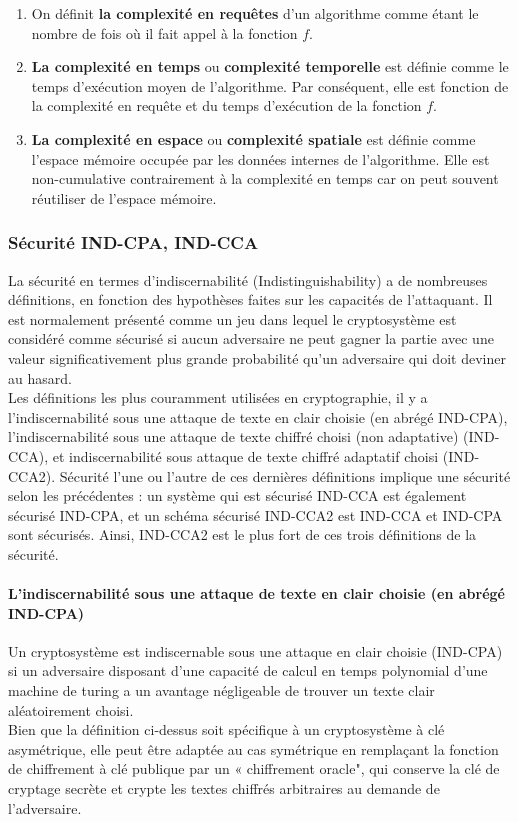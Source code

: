 \documentclass[12pt,openany]{report}
\begin{document}
\begin{enumerate}
\item On définit \textbf{la complexité en requêtes} d’un algorithme comme étant le
nombre de fois où il fait appel à la fonction $f$.

\item  \textbf{La complexité en temps} ou \textbf{complexité temporelle} est définie comme
le temps d’exécution moyen de l’algorithme. Par conséquent, elle est
fonction de la complexité en requête et du temps d’exécution de la fonction
$f$.
\item  \textbf{La complexité en espace} ou \textbf{complexité spatiale} est définie comme
l’espace mémoire occupée par les données internes de l’algorithme. Elle
est non-cumulative contrairement à la complexité en temps car on peut
souvent réutiliser de l’espace mémoire.
\end{enumerate}
\subsubsection{Sécurité IND-CPA, IND-CCA}
La sécurité en termes d'indiscernabilité (Indistinguishability) a de nombreuses définitions, en fonction des hypothèses
faites sur les capacités de l’attaquant. Il est normalement présenté comme un jeu dans lequel 
le cryptosystème est considéré comme sécurisé si aucun adversaire ne peut gagner la partie avec une valeur significativement plus grande
probabilité qu'un adversaire qui doit deviner au hasard.\\ Les définitions les plus couramment utilisées
en cryptographie, il y a l'indiscernabilité sous une attaque de texte en clair choisie (en abrégé IND-CPA), l'indiscernabilité sous une attaque de texte chiffré choisi (non adaptative) (IND-CCA),
et indiscernabilité sous attaque de texte chiffré adaptatif choisi (IND-CCA2). Sécurité
l'une ou l'autre de ces dernières définitions implique une sécurité selon les précédentes : un système qui
est sécurisé IND-CCA est également sécurisé IND-CPA, et un schéma sécurisé IND-CCA2 est
IND-CCA et IND-CPA sont sécurisés. Ainsi, IND-CCA2 est le plus fort de ces trois
définitions de la sécurité.

\paragraph{L'indiscernabilité sous une attaque de texte en clair choisie (en abrégé IND-CPA)\\}
Un cryptosystème est indiscernable sous une attaque en clair choisie (IND-CPA) si un adversaire disposant d'une capacité de calcul en temps  polynomial d'une machine de turing a un avantage négligeable de trouver un texte clair aléatoirement choisi.\\
Bien que la définition ci-dessus soit spécifique à un cryptosystème à clé asymétrique, elle peut être adaptée
au cas symétrique en remplaçant la fonction de chiffrement à clé publique par un « chiffrement
oracle", qui conserve la clé de cryptage secrète et crypte les textes chiffrés arbitraires au
demande de l’adversaire.
\end{document}
